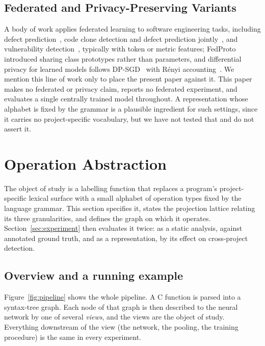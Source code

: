 \documentclass[pdflatex,sn-basic]{sn-jnl}
\theoremstyle{thmstyleone}%
\begin{document}
\subsection{Federated and Privacy-Preserving Variants}
A body of work applies federated learning to software engineering tasks,
including defect prediction~\citep{yamamoto2023flr}, code clone detection and
defect prediction jointly~\citep{yang2024federated}, and vulnerability
detection~\citep{zhang2024flvul, hu2024vulfl}, typically with token or metric
features; FedProto~\citep{tan2022fedproto} introduced sharing class prototypes
rather than parameters, and differential privacy for learned models follows
DP-SGD~\citep{abadi2016deep} with R\'enyi accounting~\citep{mironov2019rdp}.
We mention this line of work only to place the present paper against it. This
paper makes no federated or privacy claim, reports no federated experiment, and
evaluates a single centrally trained model throughout. A representation whose
alphabet is fixed by the grammar is a plausible ingredient for such settings,
since it carries no project-specific vocabulary, but we have not tested that
and do not assert it.


\section{Operation Abstraction}
\label{sec:method}

The object of study is a labelling function that replaces a program's
project-specific lexical surface with a small alphabet of operation types
fixed by the language grammar. This section specifies it, states the
projection lattice relating its three granularities, and defines the graph on
which it operates. Section~\ref{sec:experiment} then evaluates it twice: as a
static analysis, against annotated ground truth, and as a representation, by
its effect on cross-project detection.

\subsection{Overview and a running example}
\label{sec:overview}

Figure~\ref{fig:pipeline} shows the whole pipeline. A C function is parsed into
a syntax-tree graph. Each node of that graph is then described to the neural
network by one of several \emph{views}, and the views are the object of study.
Everything downstream of the view (the network, the pooling, the training
procedure) is the same in every experiment.
\end{document}
